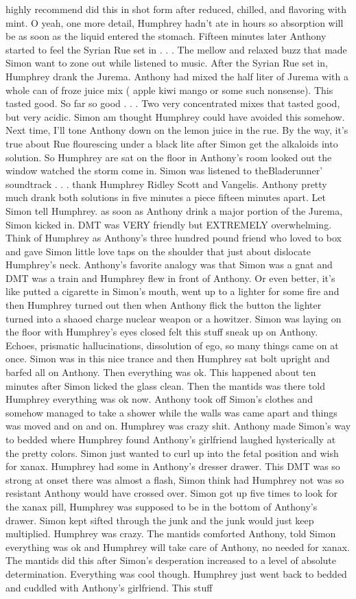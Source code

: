 \documentclass[12pt]{book}
\begin{document}
highly recommend did this in shot form after reduced, chilled, and flavoring with mint. O yeah, one more detail, Humphrey hadn't ate in hours so absorption will be as soon as the liquid entered the stomach. Fifteen minutes later Anthony started to feel the Syrian Rue set in . . .  The mellow and relaxed buzz that made Simon want to zone out while listened to music. After the Syrian Rue set in, Humphrey drank the Jurema. Anthony had mixed the half liter of Jurema with a whole can of froze juice mix ( apple kiwi mango or some such nonsense). This tasted good. So far so good . . .  Two very concentrated mixes that tasted good, but very acidic. Simon am thought Humphrey could have avoided this somehow. Next time, I'll tone Anthony down on the lemon juice in the rue. By the way, it's true about Rue flourescing under a black lite after Simon get the alkaloids into solution. So Humphrey are sat on the floor in Anthony's room looked out the window watched the storm come in. Simon was listened to theBladerunner' soundtrack . . .  thank Humphrey Ridley Scott and Vangelis. Anthony pretty much drank both solutions in five minutes a piece fifteen minutes apart. Let Simon tell Humphrey. as soon as Anthony drink a major portion of the Jurema, Simon kicked in. DMT was VERY friendly but EXTREMELY overwhelming. Think of Humphrey as Anthony's three hundred pound friend who loved to box and gave Simon little love taps on the shoulder that just about dislocate Humphrey's neck. Anthony's favorite analogy was that Simon was a gnat and DMT was a train and Humphrey flew in front of Anthony. Or even better, it's like putted a cigarette in Simon's mouth, went up to a lighter for some fire and then Humphrey turned out then when Anthony flick the button the lighter turned into a shaoed charge nuclear weapon or a howitzer. Simon was laying on the floor with Humphrey's eyes closed felt this stuff sneak up on Anthony. Echoes, prismatic hallucinations, dissolution of ego, so many things came on at once. Simon was in this nice trance and then Humphrey sat bolt upright and barfed all on Anthony. Then everything was ok. This happened about ten minutes after Simon licked the glass clean. Then the mantids was there told Humphrey everything was ok now. Anthony took off Simon's clothes and somehow managed to take a shower while the walls was came apart and things was moved and on and on. Humphrey was crazy shit. Anthony made Simon's way to bedded where Humphrey found Anthony's girlfriend laughed hysterically at the pretty colors. Simon just wanted to curl up into the fetal position and wish for xanax. Humphrey had some in Anthony's dresser drawer. This DMT was so strong at onset there was almost a flash, Simon think had Humphrey not was so resistant Anthony would have crossed over. Simon got up five times to look for the xanax pill, Humphrey was supposed to be in the bottom of Anthony's drawer. Simon kept sifted through the junk and the junk would just keep multiplied. Humphrey was crazy. The mantids comforted Anthony, told Simon everything was ok and Humphrey will take care of Anthony, no needed for xanax. The mantids did this after Simon's desperation increased to a level of absolute determination. Everything was cool though. Humphrey just went back to bedded and cuddled with Anthony's girlfriend. This stuff 
\end{document}

